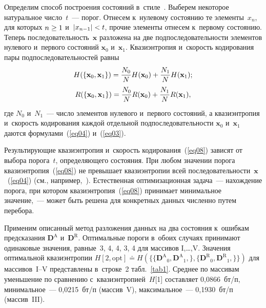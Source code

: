 \begin{multicols}{2}
Определим способ построения состояний в~стиле~\cite{b5}. Выберем некоторое натуральное число~$t$~--- 
порог. Отнесем к~нулевому состоянию те элементы~$x_n$, для которых $n\hm\geq 1$ и~$|x_{n-1}|\hm<t$, 
прочие элементы отнесем к~первому состоянию. Теперь последовательность~$\mathbf{x}$  
разложена на две подпоследовательности элементов нулевого и~первого состояний $\mathbf{x}_0$ 
и~$\mathbf{x}_1$. Квазиэнтропия и~скорость кодирования пары подпоследовательностей равны
\begin{multline}
H(\{ \mathbf{x}_0, \mathbf{x}_1 \}) = 
\displaystyle\frac{\displaystyle N_0\mathstrut}{\displaystyle N\mathstrut}H(\mathbf{x}_0) + \displaystyle\frac{\displaystyle N_1\mathstrut}{\displaystyle N\mathstrut}H(\mathbf{x}_1); \\
R(\{ \mathbf{x}_0, \mathbf{x}_1 \}) = 
\displaystyle\frac{\displaystyle N_0\mathstrut}{\displaystyle N\mathstrut}R(\mathbf{x}_0) + \displaystyle\frac{\displaystyle N_1\mathstrut}{\displaystyle N\mathstrut}R(\mathbf{x}_1), 
\label{eq08}
\end{multline}
где $N_0$ и~$N_1$~--- число элементов нулевого и~первого состояний, а квазиэнтропия
 и~ско\-рость кодирования каждой отдельной подпоследовательности $\mathbf{x}_0$ 
и~$\mathbf{x}_1$ даются формулами~(\ref{eq04}) и~(\ref{eq03}).

Результирующие квазиэнтропия и~скорость кодирования~(\ref{eq08}) зависят 
от выбора порога~$t$, определяющего состояния. При любом значении порога квазиэнтропия~(\ref{eq08}) 
не превышает квазиэнтропии всей последовательности~$\mathbf{x}$~(\ref{eq04}) 
(см., например,~\cite{b4}). Естественная оптимизационная задача~--- 
нахождение порога, при котором квазиэнтропия~(\ref{eq08}) принимает минимальное значение,~--- 
может быть решена для конкретных данных численно путем перебора.

Применим описанный метод разложения данных на два состояния к~ошибкам 
предсказания   $\mathbf{D}^\text{A}$ и~$\mathbf{D}^\text{R}$. 
Оптимальные пороги в~обоих случаях принимают одинаковые значения, равные~3, 4, 4, 3, 4 
для массивов I,\dots,V. Значения оптимальной квазиэнтропии
$H[2,\text{opt}] \doteq H(\{ 
\{{\mathbf{D}^\text{A} }_0,{\mathbf{D}^\text{A} }_1,\},
\{{\mathbf{D}^\text{R} }_0,{\mathbf{D}^\text{R} }_1,\}
\})$
для массивов~I--V представлены в~строке~2 табл.~\ref{tab1}. 
Среднее по массивам уменьшение по сравнению с~квазиэнтропией~$H$[1] составляет 0,0866~бт/п, 
минимальное~--- 0,0215~бт/п (массив~V), максимальное~--- 0,1930~бт/п (массив~III).


\end{multicols}
